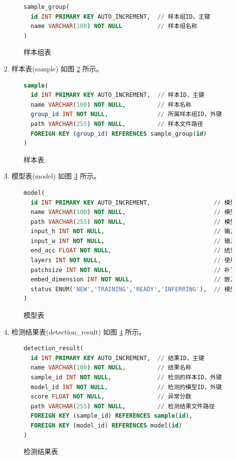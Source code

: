 \documentclass[
  ]{njuthesis}
\begin{document}
\begin{figure}[H]
    \caption{样本组表}
    \label{样本组表}
    \begin{lstlisting}[language=sql]
sample_group(
  id INT PRIMARY KEY AUTO_INCREMENT,  // 样本组ID，主键
  name VARCHAR(100) NOT NULL          // 样本组名称
)
    \end{lstlisting}
\end{figure}

2. 样本表(sample) 如图 \ref{样本表} 所示。

\begin{figure}[H]
    \caption{样本表}
    \label{样本表}
    \begin{lstlisting}[language=sql]
sample(
  id INT PRIMARY KEY AUTO_INCREMENT,  // 样本ID，主键
  name VARCHAR(100) NOT NULL,         // 样本名称
  group_id INT NOT NULL,              // 所属样本组ID，外键
  path VARCHAR(255) NOT NULL,         // 样本文件路径
  FOREIGN KEY (group_id) REFERENCES sample_group(id)
)
    \end{lstlisting}
\end{figure}

3. 模型表(model) 如图 \ref{模型表} 所示。

\begin{figure}[H]
    \caption{模型表}
    \label{模型表}
    \begin{lstlisting}[language=sql]
model(
  id INT PRIMARY KEY AUTO_INCREMENT,                  // 模型ID，主键
  name VARCHAR(100) NOT NULL,                         // 模型名称
  path VARCHAR(255) NOT NULL,                         // 模型文件路径
  input_h INT NOT NULL,                               // 输入高度  
  input_w INT NOT NULL,                               // 输入宽度
  end_acc FLOAT NOT NULL,                             // 结束精度
  layers INT NOT NULL,                                // 使用的层数
  patchsize INT NOT NULL,                             // 补丁大小
  embed_dimension INT NOT NULL,                       // 嵌入维度
  status ENUM('NEW','TRAINING','READY','INFERRING'),  // 模型状态
)
    \end{lstlisting}
\end{figure}

4. 检测结果表(detection\_result) 如图 \ref{检测结果表} 所示。

\begin{figure}[H]
    \caption{检测结果表}
    \label{检测结果表}
    \begin{lstlisting}[language=sql]
detection_result(
  id INT PRIMARY KEY AUTO_INCREMENT,  // 结果ID，主键
  name VARCHAR(100) NOT NULL,         // 结果名称
  sample_id INT NOT NULL,             // 检测的样本ID，外键
  model_id INT NOT NULL,              // 检测的模型ID，外键
  score FLOAT NOT NULL,               // 异常分数
  path VARCHAR(255) NOT NULL,         // 检测结果文件路径
  FOREIGN KEY (sample_id) REFERENCES sample(id),
  FOREIGN KEY (model_id) REFERENCES model(id)
)
    \end{lstlisting}
\end{figure}
\end{document}
